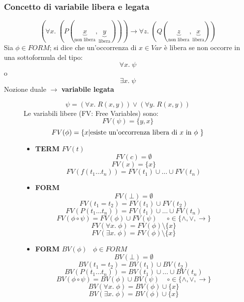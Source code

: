 \documentclass{article}
\theoremstyle{break}
\theoremstyle{break}
\theoremstyle{break}
\theoremstyle{break}
\begin{document}
\subsubsection{Concetto di variabile libera e legata}
\[
  (\forall x.\; (P(\underbrace{x}_{\text{non libera}},\underbrace{y}_{\text{libera}}))) \to \forall z.\; (Q(\underbrace{z}_{\text{non libera}},\underbrace{x}_{\text{libera}}))
\] 
Sia \( \phi \in FORM \); si dice che un'occorrenza di \( x \in Var \) è libera se non occorre
in una sottoformula del tipo:
\[ \forall x.\; \psi \] o \[ \exists x.\; \psi \] 
Nozione duale \( \to  \) \textbf{variabile legata}
\begin{figure}[H]
  \begin{example}
    \[
    \psi = (\forall x.\; R(x,y)) \vee (\forall y.\; R(x,y))
    \] 
    Le variabili libere (FV: Free Variables) sono:
    \[
    FV(\psi) = \{y,x\}
    \] 
    \[
    FV(\phi) = \{x | \text{esiste un'occorrenza libera di \( x \) in \( \phi \) }\} 
    \] 
  \end{example}
\end{figure}

\begin{figure}[H]
  \begin{definition}
    \begin{itemize}
      \item \textbf{TERM} \( FV(t) \) 
        \[
        FV(c) = \emptyset
        \] 
        \[
        FV(x) = \{x\} 
        \] 
        \[
        FV(f(t_1 \ldots t_n)) = FV(t_1) \cup \ldots \cup FV(t_n)
        \] 
      \item \textbf{FORM}
        \[
        FV(\bot) = \emptyset
        \] 
        \[
        FV(t_1 = t_2) = FV(t_1) \cup FV(t_2)
        \] 
        \[
        FV(P(t_1 \ldots t_n)) = FV(t_1) \cup \ldots \cup FV(t_n)
        \] 
        \[
        FV(\phi \circ \psi) = FV(\phi) \cup FV(\psi) \;\;\;\;\; \circ \in \{\wedge, \vee, \to \}
        \] 
        \[
        FV(\forall x.\; \phi) = FV(\phi) \setminus \{x\}
        \] 
        \[
        FV(\exists x.\; \phi) = FV(\phi) \setminus \{x\}
        \] 
    \end{itemize} 
  \end{definition}
\end{figure}

\begin{figure}[H]
  \begin{definition}
    \begin{itemize}
      \item \textbf{FORM} \( BV(\phi)\;\;\;\phi \in FORM \) 
        \[
        BV(\bot) = \emptyset
        \] 
        \[
        BV(t_1 = t_2) = BV(t_1) \cup BV(t_2) 
        \] 
        \[
        BV(P(t_1 \ldots t_n)) = BV(t_1) \cup  \ldots  \cup  BV(t_n)
        \] 
        \[
        BV(\phi \circ \psi) = BV(\phi) \cup BV(\psi) \;\;\;\; \circ \in \{\wedge, \vee, \to \} 
        \] 
        \[
        BV(\forall x.\; \phi) = BV(\phi) \cup \{x\} 
        \] 
        \[
        BV(\exists x.\; \phi) = BV(\phi) \cup \{x\} 
        \] 
    \end{itemize} 
  \end{definition}
\end{figure}
\end{document}
